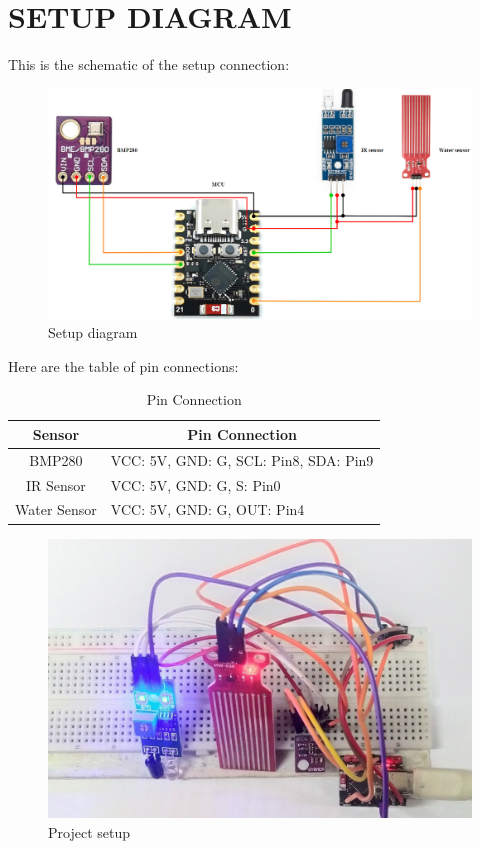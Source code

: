\section{SETUP DIAGRAM}
         This is the schematic of the setup connection:
         \begin{figure}[H]
             \centering
             \includegraphics[width=0.7\linewidth]{setup.png}
             \caption{Setup diagram}
             \label{fig:enter-label}
         \end{figure}
         Here are the table of pin connections:
         \begin{table}[H]
         \caption{Pin Connection}
         \centering
         \renewcommand{\arraystretch}{1.5}
         \begin{tabular}{|c|l|}
         \hline
         Sensor       & \multicolumn{1}{c|}{Pin Connection}  \\ \hline
         BMP280       & VCC: 5V,  GND: G, SCL: Pin8, SDA: Pin9 \\ \hline
         IR Sensor    & VCC: 5V, GND: G, S: Pin0             \\ \hline
         Water Sensor & VCC: 5V, GND: G, OUT: Pin4           \\ \hline
         \end{tabular}
         \end{table}
         \begin{figure}[H]
             \centering
             \includegraphics[width=0.7\linewidth]{set.png}
             \caption{Project setup}
             \label{fig:enter-label}
         \end{figure}
